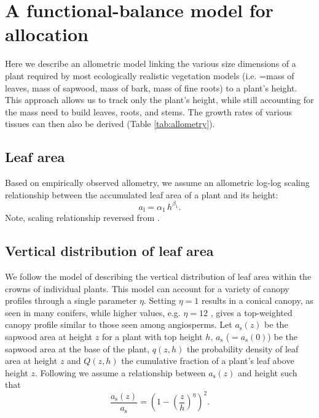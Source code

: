 \documentclass[10pt,twoside]{article}
\begin{document}
\section{A functional-balance model for
allocation}\label{a-functional-balance-model-for-allocation}

Here we describe an allometric model linking the various size dimensions
of a plant required by most ecologically realistic vegetation models
(i.e. =mass of leaves, mass of sapwood, mass of bark, mass of fine
roots) to a plant's height. This approach allows us to track only the
plant's height, while still accounting for the mass need to build
leaves, roots, and stems. The growth rates of various tissues can then
also be derived (Table \ref{tab:allometry}).

\subsection{Leaf area}\label{leaf-area}

Based on empirically observed allometry, we assume an allometric log-log
scaling relationship between the accumulated leaf area of a plant and
its height:
\begin{equation}\label{eq:ha}
a_\textrm{l}=\alpha_1 \, h^{\beta_1}.
\end{equation}
Note, scaling relationship reversed from \citep{Falster-2011}.

\subsection{Vertical distribution of leaf
area}\label{vertical-distribution-of-leaf-area}

We follow the model of \citet{Yokozawa-1995} describing the vertical
distribution of leaf area within the crowns of individual plants. This
model can account for a variety of canopy profiles through a single
parameter \(\eta\). Setting \(\eta=1\) results in a conical canopy, as
seen in many conifers, while higher values, e.g. \(\eta=12\) , gives a
top-weighted canopy profile similar to those seen among angiosperms. Let
\(a_\textrm{s}(z)\) be the sapwood area at height \(z\) for a plant with
top height \(h\), \(a_\textrm{s}\) ($= a_\textrm{s}(0)$) be the sapwood
area at the base of the plant, \(q(z,h)\) the probability density of
leaf area at height \(z\) and \(Q(z,h)\) the cumulative fraction of a
plant's leaf above height \(z\). Following \citet{Yokozawa-1995} we
assume a relationship between \(a_\textrm{s}(z)\) and height such that
\begin{equation}\label{eq:crown1}
\frac{a_\textrm{s}(z)}{a_\textrm{s}}= \left(1-\left(\frac{z}{h}\right)^\eta\right)^2.
\end{equation}
\end{document}
